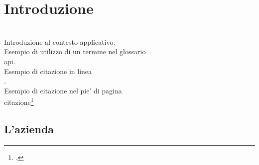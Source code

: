 \chapter{Introduzione}
\label{cap:introduzione}

\\

\noindent Introduzione al contesto applicativo.\\

\noindent Esempio di utilizzo di un termine nel glossario \\
\gls{api}. \\

\noindent Esempio di citazione in linea \\
\cite{site:agile-manifesto}. \\

\noindent Esempio di citazione nel pie' di pagina \\
citazione\footcite{womak:lean-thinking} \\

\section{L'azienda}


